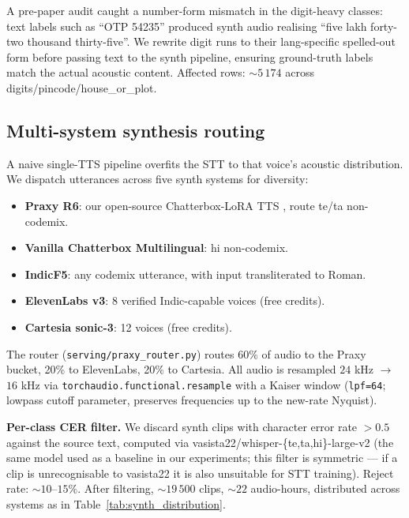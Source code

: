 \documentclass[conference,a4paper]{IEEEtran}
\begin{document}
A pre-paper audit caught a number-form mismatch in the digit-heavy classes: text labels such as ``OTP 54235'' produced synth audio realising ``five lakh forty-two thousand thirty-five''. We rewrite digit runs to their lang-specific spelled-out form before passing text to the synth pipeline, ensuring ground-truth labels match the actual acoustic content. Affected rows: $\sim 5\,174$ across digits/pincode/house\_or\_plot.

\subsection{Multi-system synthesis routing}\label{sec:flywheel}

A naive single-TTS pipeline overfits the STT to that voice's acoustic distribution. We dispatch utterances across five synth systems for diversity:

\begin{itemize}
\item \textbf{Praxy R6}: our open-source Chatterbox-LoRA TTS \cite{praxy_voice_2026}, route te/ta non-codemix.
\item \textbf{Vanilla Chatterbox Multilingual}: hi non-codemix.
\item \textbf{IndicF5}: any codemix utterance, with input transliterated to Roman.
\item \textbf{ElevenLabs v3}: 8 verified Indic-capable voices (free credits).
\item \textbf{Cartesia sonic-3}: 12 voices (free credits).
\end{itemize}

The router (\texttt{serving/praxy\_router.py}) routes 60\% of audio to the Praxy bucket, 20\% to ElevenLabs, 20\% to Cartesia. All audio is resampled $24$ kHz $\rightarrow$ $16$ kHz via \texttt{torchaudio.\allowbreak functional.\allowbreak resample} with a Kaiser window (\texttt{lpf=64}; lowpass cutoff parameter, preserves frequencies up to the new-rate Nyquist).

\textbf{Per-class CER filter.} We discard synth clips with character error rate $> 0.5$ against the source text, computed via vasista22/whisper-\{te,ta,hi\}-large-v2 (the same model used as a baseline in our experiments; this filter is symmetric --- if a clip is unrecognisable to vasista22 it is also unsuitable for STT training). Reject rate: $\sim 10$--$15\%$. After filtering, $\sim 19\,500$ clips, $\sim 22$ audio-hours, distributed across systems as in Table~\ref{tab:synth_distribution}.
\end{document}
